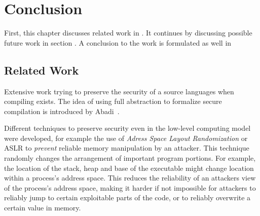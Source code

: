 \chapter{Conclusion}
\label{chap:conclusion}
First, this chapter discusses related work in .
It continues by discussing possible future work in section .
A conclusion to the work is formulated as well in 

\section{Related Work}
\label{sec:relatedwork}
Extensive work trying to preserve the security of a source languages when compiling exists.
The idea of using full abstraction to formalize secure compilation is introduced by Abadi~\cite{Abadi}.

Different techniques to preserve security even in the low-level computing model were developed, for example the use of \emph{Adress Space Layout Randomization} or ASLR to \emph{prevent} reliable memory manipulation by an attacker.
This technique randomly changes the arrangement of important program portions.
For example, the location of the stack, heap and base of the executable might change location within a process's address space.
This reduces the reliability of an attackers view of the process's address space, making it harder if not impossible for attackers to reliably jump to certain exploitable parts of the code, or to reliably overwrite a certain value in memory.

